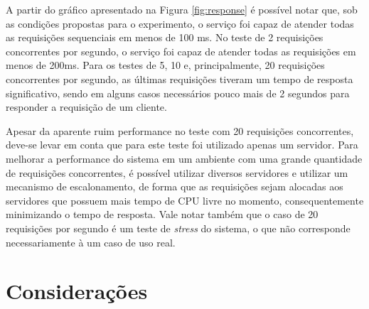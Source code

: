 A partir do gráfico apresentado na Figura \ref{fig:response} é possível notar que, sob as condições propostas para o experimento, o serviço foi capaz de atender todas as requisições sequenciais em menos de 100 ms.
No teste de 2 requisições concorrentes por segundo, o serviço foi capaz de atender todas as requisições em menos de 200ms.
Para os testes de 5, 10 e, principalmente, 20 requisições concorrentes por segundo, as últimas requisições tiveram um tempo de resposta significativo, sendo em alguns casos necessários pouco mais de 2 segundos para responder a requisição de um cliente.

Apesar da aparente ruim performance no teste com 20 requisições concorrentes, deve-se levar em conta que para este teste foi utilizado apenas um servidor.
Para melhorar a performance do sistema em um ambiente com uma grande quantidade de requisições concorrentes, é possível utilizar diversos servidores e utilizar um mecanismo de escalonamento, de forma que as requisições sejam alocadas aos servidores que possuem mais tempo de CPU livre no momento, consequentemente minimizando o tempo de resposta.
Vale notar também que o caso de 20 requisições por segundo é um teste de \emph{stress} do sistema, o que não corresponde necessariamente à um caso de uso real.

\section{Considerações}
\label{sec:consid}
